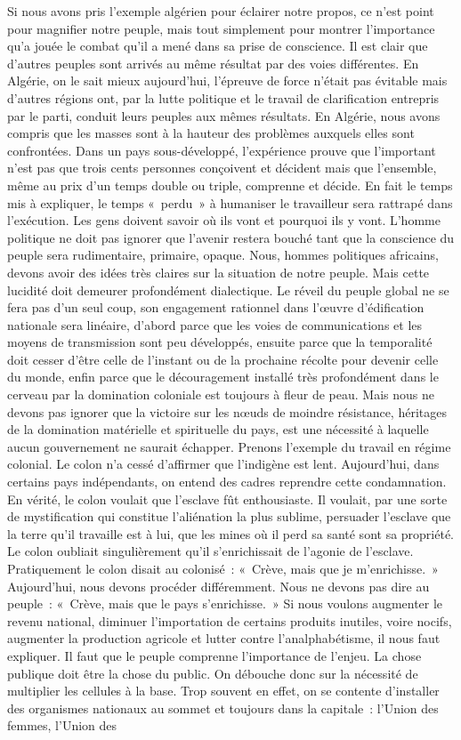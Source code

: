 \documentclass[french,twoside]{book} %
\begin{document}
\noindent Si nous avons pris l’exemple algérien pour éclairer notre propos, ce n’est point pour magnifier notre peuple, mais tout simplement pour montrer l’importance qu’a jouée le combat qu’il a mené dans sa prise de conscience. Il est clair que d’autres peuples sont arrivés au même résultat par des voies différentes.   En Algérie, on le sait mieux aujourd’hui, l’épreuve de force n’était pas évitable mais d’autres régions ont, par la lutte politique et le travail de clarification entrepris par le parti, conduit leurs peuples aux mêmes résultats. En Algérie, nous avons compris que les masses sont à la hauteur des problèmes auxquels elles sont confrontées. Dans un pays sous-développé, l’expérience prouve que l’important n’est pas que trois cents personnes conçoivent et décident mais que l’ensemble, même au prix d’un temps double ou triple, comprenne et décide. En fait le temps mis à expliquer, le temps « perdu » à humaniser le travailleur sera rattrapé dans l’exécution. Les gens doivent savoir où ils vont et pourquoi ils y vont. L’homme politique ne doit pas ignorer que l’avenir restera bouché tant que la conscience du peuple sera rudimentaire, primaire, opaque. Nous, hommes politiques africains, devons avoir des idées très claires sur la situation de notre peuple. Mais cette lucidité doit demeurer profondément dialectique. Le réveil du peuple global ne se fera pas d’un seul coup, son engagement rationnel dans l’œuvre d’édification nationale sera linéaire, d’abord parce que les voies de communications et les moyens de transmission sont peu développés, ensuite parce que la temporalité doit cesser d’être celle de l’instant ou de la prochaine récolte pour devenir celle du monde, enfin parce que le découragement installé très profondément dans le cerveau par la domination coloniale est toujours à fleur de peau. Mais nous ne devons pas ignorer que la victoire sur les nœuds de moindre résistance, héritages de la domination matérielle et spirituelle du pays, est une nécessité à laquelle aucun gouvernement ne saurait échapper. Prenons l’exemple du travail en régime colonial. Le colon n’a cessé d’affirmer que l’indigène est lent. Aujourd’hui, dans certains pays indépendants, on entend des cadres reprendre cette condamnation. En vérité, le colon voulait que l’esclave fût enthousiaste. Il voulait, par une sorte de mystification qui constitue l’aliénation la plus sublime, persuader l’esclave que la terre qu’il travaille est à lui, que les mines où il perd sa santé sont sa propriété. Le colon oubliait singulièrement qu’il s’enrichissait de l’agonie de   l’esclave. Pratiquement le colon disait au colonisé : « Crève, mais que je m’enrichisse. » Aujourd’hui, nous devons procéder différemment. Nous ne devons pas dire au peuple : « Crève, mais que le pays s’enrichisse. » Si nous voulons augmenter le revenu national, diminuer l’importation de certains produits inutiles, voire nocifs, augmenter la production agricole et lutter contre l’analphabétisme, il nous faut expliquer. Il faut que le peuple comprenne l’importance de l’enjeu. La chose publique doit être la chose du public. On débouche donc sur la nécessité de multiplier les cellules à la base. Trop souvent en effet, on se contente d’installer des organismes nationaux au sommet et toujours dans la capitale : l’Union des femmes, l’Union des 
\end{document}
